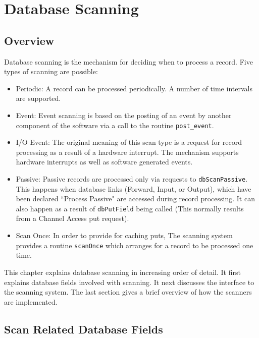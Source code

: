 \chapter{Database Scanning}

\section{Overview}

Database scanning is the mechanism for deciding when to process a record. Five types of scanning are possible:

\begin{itemize}
\item {}Periodic:  A record can be processed periodically. A number of time intervals are supported.

\item {}Event:  Event scanning is based on the posting of an event by another component of the software via a call to the 
routine \verb|post_event|.

\item {}I/O Event:  The original meaning of this scan type is a request for record processing as a result of a hardware 
interrupt. The mechanism supports hardware interrupts as well as software generated events.

\item {}Passive:  Passive records are processed only via requests to \verb|dbScanPassive|. This happens when database links 
(Forward, Input, or Output), which have been declared ``Process Passive" are accessed during record processing. It 
can also happen as a result of \verb|dbPutField| being called (This normally results from a Channel Access put 
request).

\item {}Scan Once:  In order to provide for caching puts, The scanning system provides a routine \verb|scanOnce| which 
arranges for a record to be processed one time.

\end{itemize}

This chapter explains database scanning in increasing order of detail. It first explains database fields involved with 
scanning. It next discusses the interface to the scanning system. The last section gives a brief overview of how the 
scanners are implemented. 

\section{Scan Related Database Fields}

